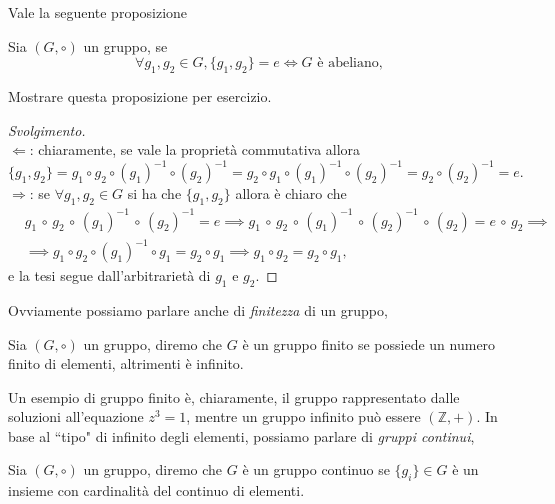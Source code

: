 Vale la seguente proposizione

\begin{prop}
	Sia $(G, \circ)$ un gruppo, se
	\begin{equation}
		\forall g_1, g_2 \in G, \{ g_1, g_2 \} = e \iff G \text{ è abeliano},
	\end{equation}
\end{prop}
\begin{exercise}
	Mostrare questa proposizione per esercizio.
\end{exercise}

\begin{proof}[Svolgimento] \hspace{1cm} \\
	$\boxed{\Leftarrow}$: chiaramente, se vale la proprietà commutativa allora
	\begin{equation}
		\{ g_1, g_2 \} = g_1 \circ g_2 \circ (g_1)^{-1} \circ (g_2)^{-1} = g_2 \circ g_1 \circ (g_1)^{-1} \circ (g_2)^{-1} = g_2 \circ (g_2)^{-1} = e.
	\end{equation}
	$\boxed{\Rightarrow}$: se $\forall g_1, g_2 \in G$ si ha che $\{ g_1, g_2 \}$ allora è chiaro che
	\begin{align}
		&g_1 \, \circ \, g_2 \, \circ \, (g_1)^{-1} \, \circ \, (g_2)^{-1} = e \implies g_1 \, \circ \, g_2 \, \circ \, (g_1)^{-1} \, \circ \, (g_2)^{-1} \, \circ \, (g_2) = e \, \circ \, g_2 \implies \nonumber \\
		&\implies g_1 \circ g_2 \circ (g_1)^{-1} \circ g_1 = g_2 \circ g_1 \implies g_1 \circ g_2 = g_2 \circ g_1,
	\end{align}
	e la tesi segue dall'arbitrarietà di $g_1$ e $g_2$.
\end{proof}

Ovviamente possiamo parlare anche di \emph{finitezza} di un gruppo,

\begin{definition}
	Sia $(G, \circ)$ un gruppo, diremo che $G$ è un gruppo finito se possiede un numero finito di elementi, altrimenti è infinito.
\end{definition}

Un esempio di gruppo finito è, chiaramente, il gruppo rappresentato dalle soluzioni all'equazione $z^3 = 1$, mentre un gruppo infinito può essere $(\mathbb{Z}, +)$. In base al ``tipo" di infinito degli elementi, possiamo parlare di \emph{gruppi continui},

\begin{definition}
	Sia $(G, \circ)$ un gruppo, diremo che $G$ è un gruppo continuo se $\{ g_i \} \in G$ è un insieme con cardinalità del continuo di elementi.
\end{definition}

